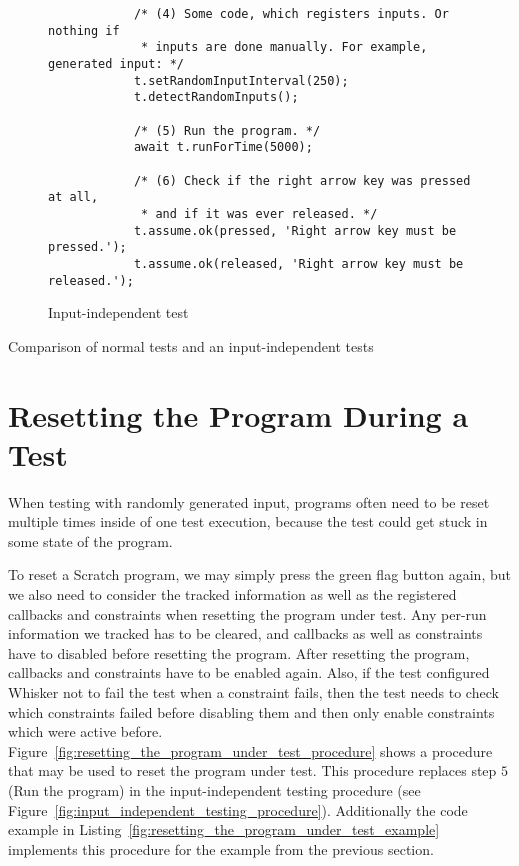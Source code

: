 \begin{listing}[htpb]
\begin{subfigure}[b]{.50\textwidth}
\begin{verbatim}
            /* (4) Some code, which registers inputs. Or nothing if
             * inputs are done manually. For example, generated input: */
            t.setRandomInputInterval(250);
            t.detectRandomInputs();

            /* (5) Run the program. */
            await t.runForTime(5000);

            /* (6) Check if the right arrow key was pressed at all,
             * and if it was ever released. */
            t.assume.ok(pressed, 'Right arrow key must be pressed.');
            t.assume.ok(released, 'Right arrow key must be released.');
        \end{verbatim}
        \vspace{-\bigskipamount}
        \caption{Input-independent test}
        \label{fig:normal_input_independent_test_comparison_constraint}
    \end{subfigure}
    \caption{Comparison of normal tests and an input-independent tests}
    \label{fig:normal_input_independent_test_comparison}
\end{listing}

\section{Resetting the Program During a Test}
\label{sec:resetting_the_program_during_a_test}

When testing with randomly generated input, programs often need to be reset multiple times inside of one test execution,
because the test could get stuck in some state of the program.
\parspace

To reset a Scratch program, we may simply press the green flag button again,
but we also need to consider the tracked information as well as the registered callbacks and constraints when resetting the program under test.
Any per-run information we tracked has to be cleared, and callbacks as well as constraints have to disabled before resetting the program.
After resetting the program, callbacks and constraints have to be enabled again.
Also, if the test configured Whisker not to fail the test when a constraint fails, then the test needs to check which constraints failed before disabling them
and then only enable constraints which were active before.
Figure~\ref{fig:resetting_the_program_under_test_procedure} shows a procedure that may be used to reset the program under test.
This procedure replaces step $5$ (Run the program) in the input-independent testing procedure (see Figure~\ref{fig:input_independent_testing_procedure}).
Additionally the code example in Listing~\ref{fig:resetting_the_program_under_test_example}
implements this procedure for the example from the previous section.
\parspace

